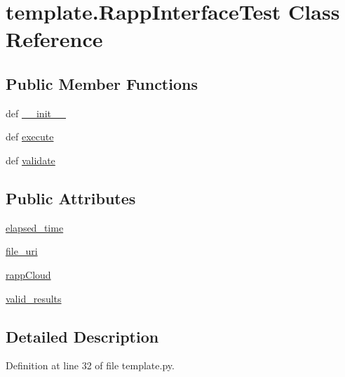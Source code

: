 \hypertarget{classtemplate_1_1RappInterfaceTest}{\section{template.\-Rapp\-Interface\-Test Class Reference}
\label{classtemplate_1_1RappInterfaceTest}
}
\subsection*{Public Member Functions}
\begin{DoxyCompactItemize}
\item 
def \hyperlink{classtemplate_1_1RappInterfaceTest_a54475f66395d3862e270adf743deab41}{\-\_\-\-\_\-init\-\_\-\-\_\-}
\item 
def \hyperlink{classtemplate_1_1RappInterfaceTest_aa43ae1491e31405d41632d08fcba6ea3}{execute}
\item 
def \hyperlink{classtemplate_1_1RappInterfaceTest_aa0e94765ca3348ec458a0f579b08e0de}{validate}
\end{DoxyCompactItemize}
\subsection*{Public Attributes}
\begin{DoxyCompactItemize}
\item 
\hyperlink{classtemplate_1_1RappInterfaceTest_a894f5220424cf7b3232125531a15362b}{elapsed\-\_\-time}
\item 
\hyperlink{classtemplate_1_1RappInterfaceTest_a012089ef5d3f918314eaca2c1e055fc5}{file\-\_\-uri}
\item 
\hyperlink{classtemplate_1_1RappInterfaceTest_af8acde807af334d32f13f19037cfeba9}{rapp\-Cloud}
\item 
\hyperlink{classtemplate_1_1RappInterfaceTest_a239eefdd36f007153ae692ade8d9dfec}{valid\-\_\-results}
\end{DoxyCompactItemize}


\subsection{Detailed Description}


Definition at line 32 of file template.\-py.



